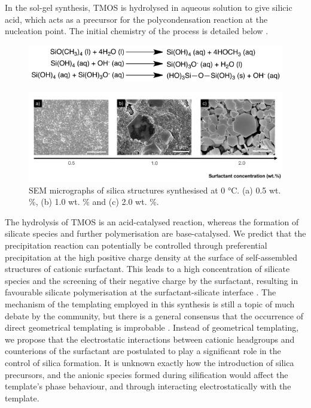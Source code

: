 \documentclass[a4paper,12pt,twocolumn]{article}
\begin{document}
  	In the sol-gel synthesis, TMOS is hydrolysed in aqueous solution to give silicic acid, which acts as a precursor for the polycondensation reaction at the nucleation point. The initial chemistry of the process is detailed below \cite{yang2008}. 
  	
  	\begin{figure}[!h]
		\includegraphics[width=\linewidth]{mechanism.png}
  	\end{figure}
  	
  	  	\begin{figure}[t!]
  	\centering
		\includegraphics[width=\textwidth]{0deg.jpg}
 		\caption{SEM micrographs of silica structures synthesised at 0 °C. (a) 0.5 wt. \%, (b) 1.0 wt. \% and (c) 2.0 wt. \%.}
 	\end{figure}  
  	The hydrolysis of TMOS is an acid-catalysed reaction, whereas the formation of silicate species and further polymerisation are base-catalysed. We predict that the precipitation reaction can potentially be controlled through preferential precipitation at the high positive charge density at the surface of self-assembled structures of cationic surfactant. This leads to a high concentration of silicate species and the screening of their negative charge by the surfactant, resulting in favourable silicate polymerisation at the surfactant-silicate interface \cite{monnier1993}. The mechanism of the templating employed in this synthesis is still a topic of much debate by the community, but there is a general consensus that the occurrence of direct geometrical templating is improbable \cite{colfen2007}. Instead of geometrical templating, we propose that the electrostatic interactions between cationic headgroups and counterions of the  surfactant are postulated to play a significant role in the control of silica formation. It is unknown exactly how the introduction of silica precursors, and the anionic species formed during silification would affect the template’s phase behaviour, and through interacting electrostatically with the template.
  	
\end{document}
